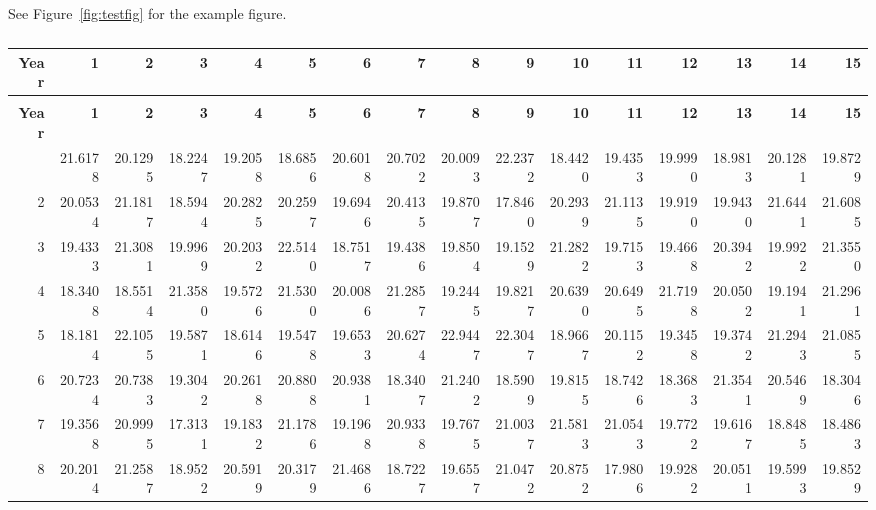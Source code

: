 \documentclass[12pt]{article}\usepackage[]{graphicx}\usepackage[]{color}
\begin{document}
See Figure~\ref{fig:testfig} for the example figure.

\clearpage

\begingroup\fontsize{8}{10}\selectfont
\begin{landscape}
\begin{longtable}[t]{rrrrrrrrrrrrrrrr}
\caption{\label{tab:widelong}A long and wide table}\\
\toprule
\textbf{Year} & \textbf{1} & \textbf{2} & \textbf{3} & \textbf{4} & \textbf{5} & \textbf{6} & \textbf{7} & \textbf{8} & \textbf{9} & \textbf{10} & \textbf{11} & \textbf{12} & \textbf{13} & \textbf{14} & \textbf{15}\\
\midrule
\endfirsthead
\caption*{}\\
\toprule
\textbf{Year} & \textbf{1} & \textbf{2} & \textbf{3} & \textbf{4} & \textbf{5} & \textbf{6} & \textbf{7} & \textbf{8} & \textbf{9} & \textbf{10} & \textbf{11} & \textbf{12} & \textbf{13} & \textbf{14} & \textbf{15}\\
\midrule
\endhead
\
\endfoot
\bottomrule
\endlastfoot
1 & 21.6178 & 20.1295 & 18.2247 & 19.2058 & 18.6856 & 20.6018 & 20.7022 & 20.0093 & 22.2372 & 18.4420 & 19.4353 & 19.9990 & 18.9813 & 20.1281 & 19.8729\\
2 & 20.0534 & 21.1817 & 18.5944 & 20.2825 & 20.2597 & 19.6946 & 20.4135 & 19.8707 & 17.8460 & 20.2939 & 21.1135 & 19.9190 & 19.9430 & 21.6441 & 21.6085\\
3 & 19.4333 & 21.3081 & 19.9969 & 20.2032 & 22.5140 & 18.7517 & 19.4386 & 19.8504 & 19.1529 & 21.2822 & 19.7153 & 19.4668 & 20.3942 & 19.9922 & 21.3550\\
4 & 18.3408 & 18.5514 & 21.3580 & 19.5726 & 21.5300 & 20.0086 & 21.2857 & 19.2445 & 19.8217 & 20.6390 & 20.6495 & 21.7198 & 20.0502 & 19.1941 & 21.2961\\
5 & 18.1814 & 22.1055 & 19.5871 & 18.6146 & 19.5478 & 19.6533 & 20.6274 & 22.9447 & 22.3047 & 18.9667 & 20.1152 & 19.3458 & 19.3742 & 21.2943 & 21.0855\\
6 & 20.7234 & 20.7383 & 19.3042 & 20.2618 & 20.8808 & 20.9381 & 18.3407 & 21.2402 & 18.5909 & 19.8155 & 18.7426 & 18.3683 & 21.3541 & 20.5469 & 18.3046\\
7 & 19.3568 & 20.9995 & 17.3131 & 19.1832 & 21.1786 & 19.1968 & 20.9338 & 19.7675 & 21.0037 & 21.5813 & 21.0543 & 19.7722 & 19.6167 & 18.8485 & 18.4863\\
8 & 20.2014 & 21.2587 & 18.9522 & 20.5919 & 20.3179 & 21.4686 & 18.7227 & 19.6557 & 21.0472 & 20.8752 & 17.9806 & 19.9282 & 20.0511 & 19.5993 & 19.8529\\

\end{longtable}
\end{landscape}
\end{document}
